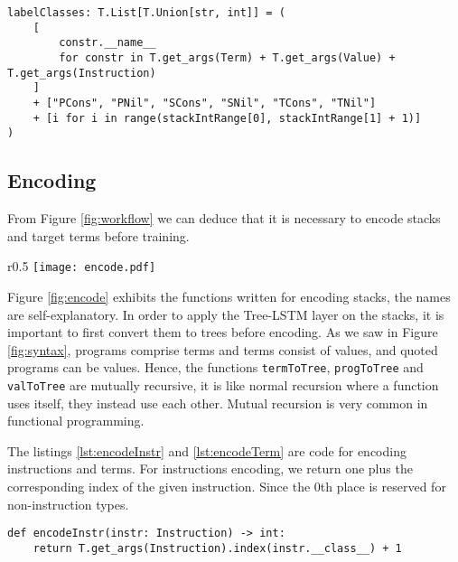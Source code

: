 \begin{listing}[H]
\begin{verbatim}
labelClasses: T.List[T.Union[str, int]] = (
    [
        constr.__name__
        for constr in T.get_args(Term) + T.get_args(Value) + T.get_args(Instruction)
    ]
    + ["PCons", "PNil", "SCons", "SNil", "TCons", "TNil"]
    + [i for i in range(stackIntRange[0], stackIntRange[1] + 1)]
)
\end{verbatim}
\caption{labelClasses}
\label{labels}
\end{listing}

\subsection{Encoding}
\label{sec:encoding}
From Figure \ref{fig:workflow} we can deduce that it is necessary to encode stacks and target terms before training. 

\begin{wrapfigure}{r}{0.5\textwidth}
    \centering
    \texttt{[image: encode.pdf]}
    \caption{Functions for encoding stacks}
    \label{fig:encode}
\end{wrapfigure}

Figure \ref{fig:encode} exhibits the functions written for encoding stacks, the names are self-explanatory. In order to apply the Tree-LSTM layer on the stacks, it is important to first convert them to trees before encoding. As we saw in Figure \ref{fig:syntax}, programs comprise terms and terms consist of values, and quoted programs can be values. Hence, the functions \texttt{termToTree}, \texttt{progToTree} and \texttt{valToTree} are mutually recursive, it is like normal recursion where a function uses itself, they instead use each other. Mutual recursion is very common in functional programming.

The listings \ref{lst:encodeInstr} and \ref{lst:encodeTerm} are code for encoding instructions and terms. For instructions encoding, we return one plus the corresponding index of the given instruction. Since the 0th place is reserved for non-instruction types.

\begin{listing}[H]
\begin{verbatim}
def encodeInstr(instr: Instruction) -> int:
    return T.get_args(Instruction).index(instr.__class__) + 1
\end{verbatim}
\caption{Function for encoding an instruction}
\label{lst:encodeInstr}
\end{listing}

